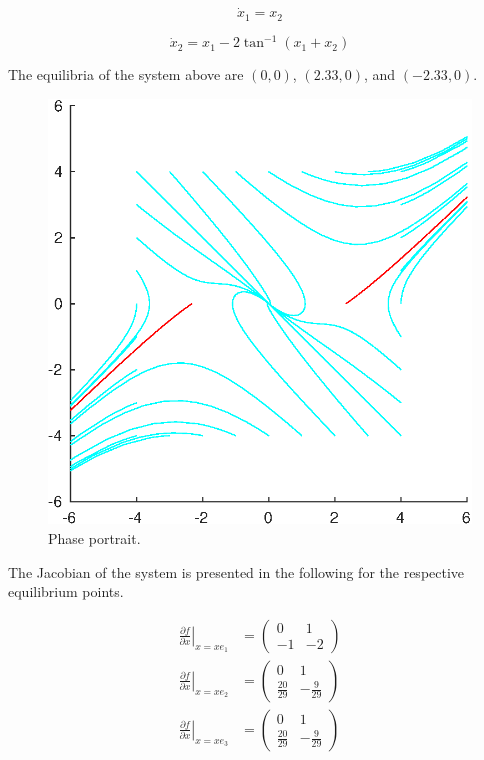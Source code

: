 \documentclass[a4paper,10pt]{article}
\begin{document}
\begin{equation}
\dot{x}_1 = {x}_2 
\end{equation}

\begin{equation}
\dot{x}_2 = {x}_1-2\tan^{-1}({x}_1+{x}_2) 
\end{equation}

The equilibria of the system above are $(0, 0)$, $(2.33, 0)$, and $(-2.33, 0)$.

\begin{figure}[H]
  \centering
  \includegraphics[width=.8\linewidth]{question5.eps}
  \caption{Phase portrait.} \label{fig:q5}
\end{figure}

The Jacobian of the system is presented in the following for the respective equilibrium points. 

\begin{eqnarray*}
    \left.\frac{\partial f}{\partial x}\right\vert_{x=xe_1}^{} &= \left(\begin{array}{cc} 0 & 1\\ -1 & -2 \end{array}\right) \\
    \left.\frac{\partial f}{\partial x}\right\vert_{x=xe_2}^{} &= \left(\begin{array}{cc} 0 & 1\\ \frac{20}{29} & -\frac{9}{29} \end{array}\right) \\
    \left.\frac{\partial f}{\partial x}\right\vert_{x=xe_3}^{} &= \left(\begin{array}{cc} 0 & 1\\ \frac{20}{29} & -\frac{9}{29} \end{array}\right) 
\end{eqnarray*}
\end{document}
